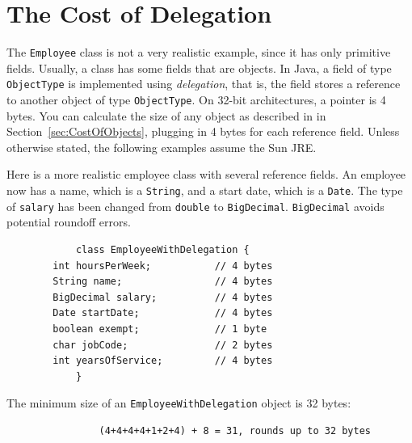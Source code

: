 \section{The Cost of Delegation}

The \texttt{Employee} class is not a very realistic example, since it has only primitive fields. Usually, a class has some fields that are objects.  In Java, a field of type \texttt{ObjectType} is implemented using \textit{delegation}, that is, the field stores a reference to another object of type \texttt{ObjectType}. On 32-bit architectures, a pointer is 4 bytes. You can calculate the size of any object as described in in Section~\ref{sec:CostOfObjects}, plugging in 4 bytes for each reference field. Unless otherwise stated, the following examples assume the Sun JRE. 
\begin{example}
Here is a more realistic employee class with several reference fields. An employee now has a name, which is a \texttt{String}, and a start date, which is a \texttt{Date}. The type of \texttt{salary} has been changed from \texttt{double} to \texttt{BigDecimal}. \texttt{BigDecimal} avoids potential roundoff errors.
\ttfamily
\begin{verbatim} 
			class EmployeeWithDelegation {
        int hoursPerWeek;           // 4 bytes
        String name;                // 4 bytes
        BigDecimal salary;          // 4 bytes
        Date startDate;             // 4 bytes
        boolean exempt;             // 1 byte
        char jobCode;               // 2 bytes
        int yearsOfService;         // 4 bytes
			}
\end{verbatim}
\normalfont
The minimum size of an \texttt{EmployeeWithDelegation} object is 32 bytes:
\begin{verbatim}
                (4+4+4+4+1+2+4) + 8 = 31, rounds up to 32 bytes
\end{verbatim} 
\end{example}

